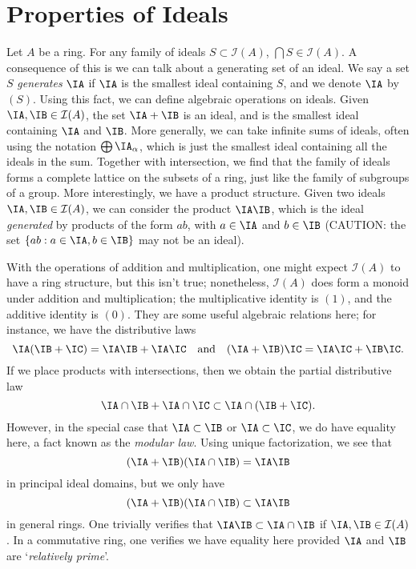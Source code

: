 \section{Properties of Ideals}

Let $A$ be a ring. For any family of ideals $S \subset \mathcal{I}(A)$, $\bigcap S \in \mathcal{I}(A)$. A consequence of this is we can talk about a generating set of an ideal. We say a set $S$ \emph{generates} $\IA$ if $\IA$ is the smallest ideal containing $S$, and we denote $\IA$ by $(S)$. Using this fact, we can define algebraic operations on ideals. Given $\IA, \IB \in \mathcal{I}(A)$, the set $\IA + \IB$ is an ideal, and is the smallest ideal containing $\IA$ and $\IB$. More generally, we can take infinite sums of ideals, often using the notation $\bigoplus \IA_\alpha$, which is just the smallest ideal containing all the ideals in the sum. Together with intersection, we find that the family of ideals forms a complete lattice on the subsets of a ring, just like the family of subgroups of a group. More interestingly, we have a product structure. Given two ideals $\IA, \IB \in \mathcal{I}(A)$, we can consider the product $\IA \IB$, which is the ideal \emph{generated} by products of the form $ab$, with $a \in \IA$ and $b \in \IB$ (CAUTION: the set $\{ ab: a \in \IA, b \in \IB \}$ may not be an ideal).

With the operations of addition and multiplication, one might expect $\mathcal{I}(A)$ to have a ring structure, but this isn't true; nonetheless, $\mathcal{I}(A)$ does form a monoid under addition and multiplication; the multiplicative identity is $(1)$, and the additive identity is $(0)$. They are some useful algebraic relations here; for instance, we have the distributive laws
%
\[ \IA(\IB + \IC) = \IA \IB + \IA \IC \quad\text{and}\quad (\IA + \IB) \IC = \IA \IC + \IB \IC. \]
%
If we place products with intersections, then we obtain the partial distributive law
%
\[ \IA \cap \IB + \IA \cap \IC \subset \IA \cap (\IB + \IC). \]
%
However, in the special case that $\IA \subset \IB$ or $\IA \subset \IC$, we do have equality here, a fact known as the \emph{modular law}. Using unique factorization, we see that
%
\[ (\IA + \IB)(\IA \cap \IB) = \IA\IB \]
%
in principal ideal domains, but we only have
%
\[ (\IA + \IB)(\IA \cap \IB) \subset \IA\IB \]
%
in general rings. One trivially verifies that $\IA \IB \subset \IA \cap \IB$ if $\IA, \IB \in \mathcal{I}(A)$. In a commutative ring, one verifies we have equality here provided $\IA$ and $\IB$ are `\emph{relatively prime}'.

